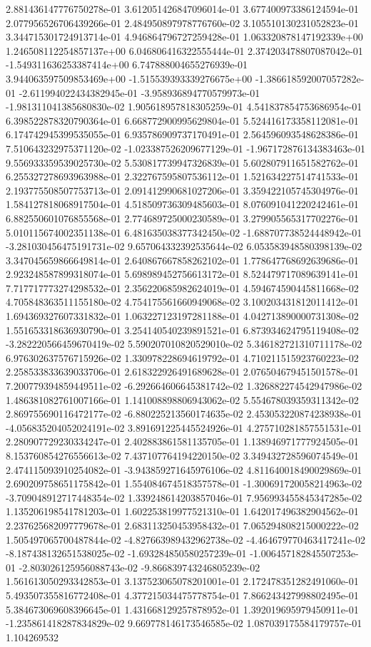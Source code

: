 2.881436147776750278e-01	3.612051426847096014e-01	3.677400973386124594e-01	2.077956526706439266e-01	2.484950897978776760e-02	3.105510130231052823e-01	3.344715301724913714e-01	4.946864796727259428e-01	1.063320878147192339e+00	1.246508112254857137e+00	6.046806416322555444e-01	2.374203478807087042e-01	-1.549311636253387414e+00	6.747888004655276939e-01	3.944063597509853469e+00	-1.515539393339276675e+00	-1.386618592007057282e-01	-2.611994022434382945e-01	-3.958936894770579973e-01	-1.981311041385680830e-02	1.905618957818305259e-01	4.541837854753686954e-01	6.398522878320790364e-01	6.668772900995629804e-01	5.524416173358112081e-01	6.174742945399535055e-01	6.935786909737170491e-01	2.564596093548628386e-01	7.510643232975371120e-02	-1.023387526209677129e-01	-1.967172876134383463e-01	9.556933359539025730e-02	5.530817739947326839e-01	5.602807911651582762e-01	6.255327278693963988e-01	2.322767595807536112e-01	1.521634227514741533e-01	2.193775508507753713e-01	2.091412990681027206e-01	3.359422105745304976e-01	1.584127818068917504e-01	4.518509736309485603e-01	8.076091041220242461e-01	6.882550601076855568e-01	2.774689725000230589e-01	3.279905565317702276e-01	5.010115674002351138e-01	6.481635038377342450e-02	-1.688707738524448942e-01	-3.281030456475191731e-02	9.657064332392535644e-02	6.053583948580398139e-02	3.347045659866649814e-01	2.640867667858262102e-01	1.778647768692639686e-01	2.923248587899318074e-01	5.698989452756613172e-01	8.524479717089639141e-01	7.717717773274298532e-01	2.356220685982624019e-01	4.594674590445811668e-02	4.705848363511155180e-02	4.754175561660949068e-02	3.100203431812011412e-01	1.694369327607331832e-01	1.063227123197281188e-01	4.042713890000731308e-02	1.551653318636930790e-01	3.254140540239891521e-01	6.873934624795119408e-02	-3.282220566459670419e-02	5.590207010820529010e-02	5.346182721310711178e-02	6.976302637576715926e-02	1.330978228694619792e-01	4.710211515923760223e-02	2.258533833639033706e-01	2.618322926491689628e-01	2.076504679451501578e-01	7.200779394859449511e-02	-6.292664606645381742e-02	1.326882274542947986e-02	1.486381082761007166e-01	1.141008898806943062e-02	5.554678039359311342e-02	2.869755690116472177e-02	-6.880225213560174635e-02	2.453053220874238938e-01	-4.056835204052024191e-02	3.891691225445524926e-01	4.275710281857551531e-01	2.280907729230334247e-01	2.402883861581135705e-01	1.138946971777924505e-01	8.153760854276556613e-02	7.437107764194220150e-02	3.349432728596074549e-01	2.474115093910254082e-01	-3.943859271645976106e-02	4.811640018490029869e-01	2.690209758651175842e-01	1.554084674518357578e-01	-1.300691720058214963e-02	-3.709048912717448354e-02	1.339248614203857046e-01	7.956993455845347285e-02	1.135206198541781203e-01	1.602253819977521310e-01	1.642017496382904562e-01	2.237625682097779678e-01	2.683113250453958432e-01	7.065294808215000222e-02	1.505497065700487844e-02	-4.827663989432962738e-02	-4.464679770463417241e-02	-8.187438132651538025e-02	-1.693284850580257239e-01	-1.006457182845507253e-01	-2.803026125956088743e-02	-9.866839743246805239e-02	1.561613050293342853e-01	3.137523065078201001e-01	2.172478351282491060e-01	5.493507355816772408e-01	4.377215034475778754e-01	7.866243427998802495e-01	5.384673069608396645e-01	1.431668129257878952e-01	1.392019695979450911e-01	-1.235861418287834829e-02	9.669778146173546585e-02	1.087039175584179757e-01	1.104269532